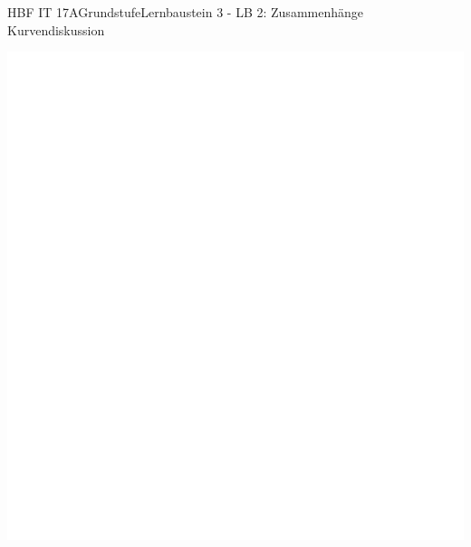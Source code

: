 \documentclass[oneside,openany,headings=optiontotoc,11pt,numbers=noenddot]{scrreprt}
\begin{document}
\begin{worksheet}{HBF IT 17A}{Grundstufe}{Lernbaustein 3 - LB 2: Zusammenhänge Kurvendiskussion}
\begin{framed}
			\includegraphics[scale=0.35]{../empty.jpg}
		\end{framed}
	\end{worksheet}
\end{document}
